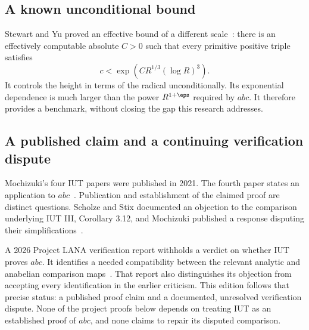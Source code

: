\subsection{A known unconditional bound}
Stewart and Yu proved an effective bound of a different scale~\cite[Theorem 1]{StewartYu2001}: there is an effectively computable absolute $C>0$ such that every primitive positive triple satisfies
\[
 c<\exp\!\left(CR^{1/3}(\log R)^3\right).
\]
It controls the height in terms of the radical unconditionally. Its exponential dependence is much larger than the power $R^{1+\eps}$ required by $abc$. It therefore provides a benchmark, without closing the gap this research addresses.

\subsection{A published claim and a continuing verification dispute}
Mochizuki's four IUT papers were published in 2021. The fourth paper states an application to $abc$~\cite{MochizukiIUTIV}. Publication and establishment of the claimed proof are distinct questions. Scholze and Stix documented an objection to the comparison underlying IUT III, Corollary 3.12, and Mochizuki published a response disputing their simplifications~\cite{ScholzeStix2018,MochizukiComments2018}.

A 2026 Project LANA verification report withholds a verdict on whether IUT proves $abc$. It identifies a needed compatibility between the relevant analytic and anabelian comparison maps~\cite{LANA2026}. That report also distinguishes its objection from accepting every identification in the earlier criticism. This edition follows that precise status: a published proof claim and a documented, unresolved verification dispute. None of the project proofs below depends on treating IUT as an established proof of $abc$, and none claims to repair its disputed comparison.
